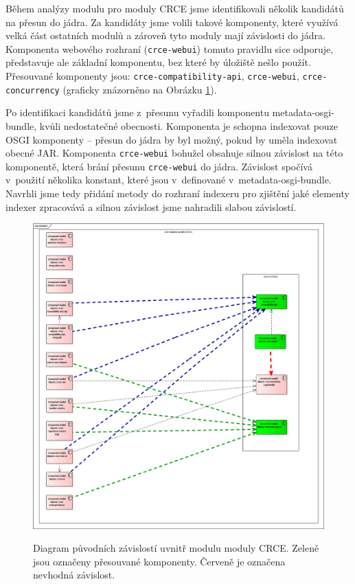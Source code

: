 \documentclass[12pt, a4paper]{article}
\begin{document}
Během analýzy modulu pro moduly CRCE jsme identifikovali několik kandidátů na přesun do jádra. Za kandidáty jsme volili takové komponenty, které využívá velká část ostatních modulů a zároveň tyto moduly mají závislosti do jádra. Komponenta webového rozhraní (\texttt{crce-webui}) tomuto pravidlu sice odporuje, představuje ale základní komponentu, bez které by úložiště nešlo použít. Přesouvané komponenty jsou: \texttt{crce-compatibility-api}, \texttt{crce-webui}, \texttt{crce-concurrency} (graficky znázorněno na Obrázku \ref{fig:modulesCRCE}). 

Po identifikaci kandidátů jsme z~přesunu vyřadili komponentu metadata-osgi-bundle, kvůli nedostatečné obecnosti. Komponenta je schopna indexovat pouze OSGI komponenty -- přesun do jádra by byl možný, pokud by uměla indexovat obecné JAR. Komponenta \texttt{crce-webui} bohužel obsahuje silnou závislost na této komponentě, která brání přesunu \texttt{crce-webui} do jádra. Závislost spočívá v~použití několika konstant, které jsou v~definované v~metadata-osgi-bundle. Navrhli jsme tedy přidání metody do rozhraní indexeru pro zjištění jaké elementy indexer zpracovává a silnou závislost jsme nahradili slabou závislostí.

\begin{figure}[h!]
\centering
\includegraphics[width=135mm]{modules.png}
\label{fig:modulesCRCE}
\caption{Diagram původních závislostí uvnitř modulu moduly CRCE. Zeleně jsou označeny přesouvané komponenty. Červeně je označena nevhodná závislost.}
\end{figure}
\end{document}
